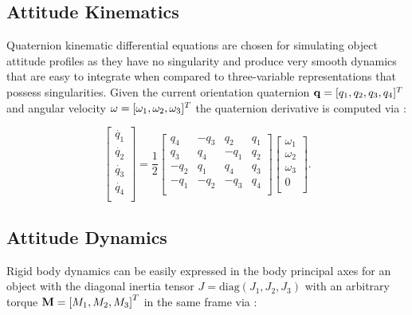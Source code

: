 \subsection{Attitude Kinematics}

Quaternion kinematic differential equations are chosen for simulating object attitude profiles as they have no singularity and produce very smooth dynamics that are easy to integrate when compared to three-variable representations that possess singularities. Given the current orientation quaternion $\mathbf{q} = [q_1, q_2, q_3, q_4]^T$ and angular velocity $\mathbf{\omega} = [\omega_1, \omega_2, \omega_3]^T$ the quaternion derivative is computed via \cite{crassidis1ed}:

\begin{equation} \label{eq:quat_kde}
    \left[\begin{matrix}\dot{q_1}\\\dot{q_2}\\\dot{q_3}\\\dot{q_4}\\\end{matrix}\right]
    =
    \frac{1}{2}\left[\begin{matrix}q_4&-q_3&q_2&q_1\\q_3&q_4&-q_1&q_2\\-q_2&q_1&q_4&q_3\\-q_1&-q_2&-q_3&q_4\\\end{matrix}\right]
    \left[\begin{matrix}\omega_1\\\omega_2\\\omega_3\\0\\\end{matrix}\right].
\end{equation} 

\subsection{Attitude Dynamics}

Rigid body dynamics can be easily expressed in the body principal axes for an object with the diagonal inertia tensor $J = \mathrm{diag}\left( J_1, J_2, J_3 \right)$ with an arbitrary torque $\mathbf{M} = \left[M_1, M_2, M_3\right]^T$ in the same frame via \cite{crassidis1ed}:

